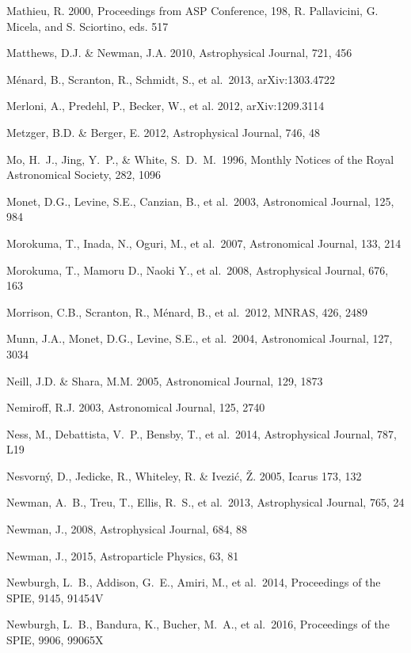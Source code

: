 \documentclass[twocolumn]{aastex61}
\begin{document}
\begin{thebibliography}{}
\bibitem[()]{} Mathieu, R. 2000, Proceedings from ASP Conference, 198, R. Pallavicini, G. Micela, and
             S. Sciortino, eds. 517

\bibitem[()]{} Matthews, D.J. \& Newman, J.A. 2010, Astrophysical Journal, 721, 456

\bibitem[()]{} M\'{e}nard, B., Scranton, R., Schmidt, S., et al.~2013, arXiv:1303.4722

\bibitem[()]{} Merloni, A., Predehl, P., Becker, W., et al. 2012, arXiv:1209.3114

\bibitem[()]{} Metzger, B.D. \& Berger, E. 2012, Astrophysical Journal, 746, 48

\bibitem[()]{} Mo, H.~J., Jing, Y.~P., \& White, S.~D.~M.\ 1996, Monthly Notices of the Royal Astronomical Society, 282, 1096

\bibitem[()]{} Monet, D.G., Levine, S.E., Canzian, B., et al.~2003, Astronomical Journal, 125, 984

\bibitem[()]{} Morokuma, T., Inada, N., Oguri, M., et al.~2007, Astronomical Journal, 133, 214

\bibitem[()]{} Morokuma, T., Mamoru D., Naoki Y., et al.~2008, Astrophysical Journal, 676, 163

\bibitem[()]{} Morrison, C.B., Scranton, R., M\'{e}nard, B., et al.~2012, MNRAS, 426, 2489

\bibitem[()]{} Munn, J.A., Monet, D.G., Levine, S.E., et al.~2004, Astronomical Journal, 127, 3034

\bibitem[()]{} Neill, J.D. \& Shara, M.M. 2005, Astronomical Journal, 129, 1873

\bibitem[()]{} Nemiroff, R.J. 2003, Astronomical Journal, 125, 2740

\bibitem[()]{} Ness, M., Debattista, V.~P., Bensby, T., et al.~2014, Astrophysical Journal, 787, L19

\bibitem[()]{} Nesvorn\'{y}, D., Jedicke, R., Whiteley, R. \& Ivezi\'{c}, \v{Z}. 2005, Icarus 173, 132

\bibitem[()]{} Newman, A.~B., Treu, T., Ellis, R.~S., et al.\ 2013, Astrophysical Journal, 765, 24

\bibitem[()]{} Newman, J., 2008, Astrophysical Journal, 684, 88

\bibitem[()]{} Newman, J., 2015, Astroparticle Physics, 63, 81

\bibitem[()]{} Newburgh, L.~B., Addison, G.~E., Amiri, M., et al.~2014, Proceedings of the SPIE, 9145, 91454V

\bibitem[()]{} Newburgh, L.~B., Bandura, K., Bucher, M.~A., et al.~2016, Proceedings of the SPIE, 9906, 99065X


\end{thebibliography}
\end{document}
